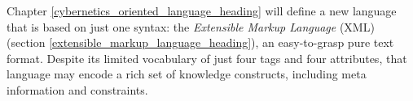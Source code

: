 Chapter \ref{cybernetics_oriented_language_heading} will define a new language
that is based on just one syntax: the \emph{Extensible Markup Language} (XML)
(section \ref{extensible_markup_language_heading}), an easy-to-grasp pure text
format. Despite its limited vocabulary of just four tags and four attributes,
that language may encode a rich set of knowledge constructs, including meta
information and constraints.
